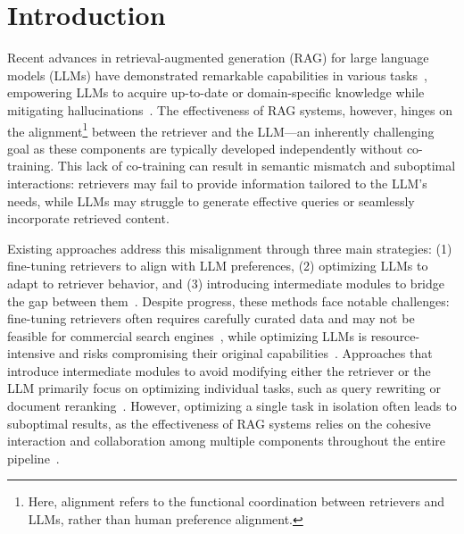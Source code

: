 \section{Introduction}

Recent advances in retrieval-augmented generation (RAG) for large language models (LLMs) have demonstrated remarkable capabilities in various tasks~\citep{claude,gpt_4o,llama3,qwen2,gemma,AsaiWWSH24,abs-2406-13629}, empowering LLMs to acquire up-to-date or domain-specific knowledge while mitigating hallucinations~\citep{abs-2312-10997,FanDNWLYCL24,abs-2406-08116}.
The effectiveness of RAG systems, however, hinges on the alignment\footnote{Here, alignment refers to the functional coordination between retrievers and LLMs, rather than human preference alignment.} between the retriever and the LLM—an inherently challenging goal as these components are typically developed independently without co-training. 
This lack of co-training can result in semantic mismatch and suboptimal interactions: retrievers may fail to provide information tailored to the LLM’s needs, while LLMs may struggle to generate effective queries or seamlessly incorporate retrieved content.

Existing approaches address this misalignment through three main strategies: (1) fine-tuning retrievers to align with LLM preferences, (2) optimizing LLMs to adapt to retriever behavior, and (3) introducing intermediate modules to bridge the gap between them~\citep{MaGHZD23,ShiMYS0LZY24,AsaiWWSH24,abs-2406-13629,auto-rag,abs-2407-02485}.
Despite progress, these methods face notable challenges: fine-tuning retrievers often requires carefully curated data and may not be feasible for commercial search engines~\citep{schmidt2014google,webgpt}, while optimizing LLMs is resource-intensive and risks compromising their original capabilities~\citep{abs-2409-10102}. 
Approaches that introduce intermediate modules to avoid modifying either the retriever or the LLM primarily focus on optimizing individual tasks, such as query rewriting or document reranking~\citep{MaGHZD23,WangLSL23,TanD0GFW24}. 
However, optimizing a single task in isolation often leads to suboptimal results, as the effectiveness of RAG systems relies on the cohesive interaction and collaboration among multiple components throughout the entire pipeline~\citep{FanDNWLYCL24,abs-2409-10102}.


